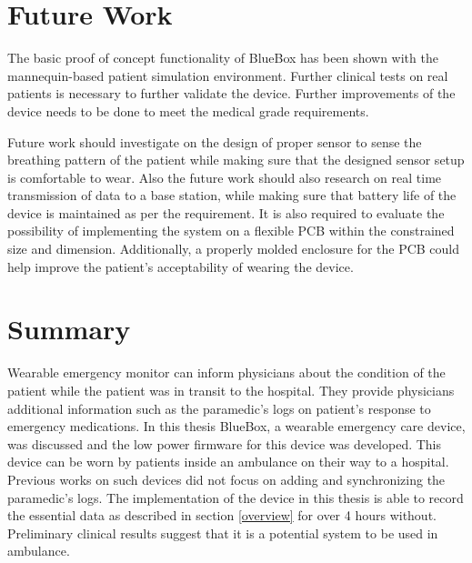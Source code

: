 \section{Future Work}
The basic proof of concept functionality of BlueBox has been shown with the  mannequin-based patient simulation environment. Further clinical tests on real patients is necessary to further validate the device. Further improvements of the  device needs to be done to meet the medical grade requirements.  

\hspace{10mm}Future work should investigate on the design of proper sensor to sense the breathing pattern of the patient while making sure that the designed sensor setup is comfortable to wear. Also the future work should also research on real time transmission of data to a base station, while making sure that battery life of the device is maintained as per the requirement. It is also required to evaluate the possibility of implementing the system on a flexible PCB within the constrained size and dimension. Additionally, a properly molded enclosure for the PCB could help improve the patient's acceptability of wearing the device. 
\section{Summary}
Wearable emergency monitor can inform physicians about the condition of the patient while the patient was in transit to the hospital. They provide physicians additional information such as the paramedic's logs on patient's response to emergency medications. In this thesis BlueBox, a wearable emergency care device, was discussed and the low power firmware for this device was developed. This device can be worn by patients inside an ambulance on their way to a hospital. Previous works on such devices did not focus on adding and synchronizing the paramedic's logs. The implementation of the device in this thesis is able to record the essential data as described in section \ref{overview} for over 4 hours without. Preliminary clinical results suggest that it is a potential system to be used in ambulance.